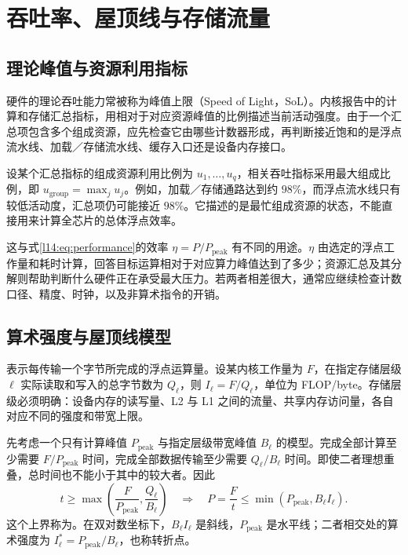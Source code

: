 \section{吞吐率、屋顶线与存储流量}
\label{l14:sec:roofline}

\subsection{理论峰值与资源利用指标}

硬件的理论吞吐能力常被称为峰值上限（Speed of Light，SoL）。内核报告中的计算和存储汇总指标，用相对于对应资源峰值的比例描述当前活动强度。由于一个汇总项包含多个组成资源，应先检查它由哪些计数器形成，再判断接近饱和的是浮点流水线、加载／存储流水线、缓存入口还是设备内存接口。

设某个汇总指标的组成资源利用比例为 $u_1,\ldots,u_q$，相关吞吐指标采用最大组成比例，即 $u_{\mathrm{group}}=\max_j u_j$。例如，加载／存储通路达到约 $98\%$，而浮点流水线只有较低活动度，汇总项仍可能接近 $98\%$。它描述的是最忙组成资源的状态，不能直接用来计算全芯片的总体浮点效率。

这与式\eqref{l14:eq:performance}的效率 $\eta=P/P_{\mathrm{peak}}$ 有不同的用途。$\eta$ 由选定的浮点工作量和耗时计算，回答目标运算相对于对应算力峰值达到了多少；资源汇总及其分解则帮助判断什么硬件正在承受最大压力。若两者相差很大，通常应继续检查计数口径、精度、时钟，以及非算术指令的开销。

\subsection{算术强度与屋顶线模型}

表示每传输一个字节所完成的浮点运算量。设某内核工作量为 $F$，在指定存储层级 $\ell$ 实际读取和写入的总字节数为 $Q_\ell$，则 $I_\ell=F/Q_\ell$，单位为 FLOP/byte。存储层级必须明确：设备内存的读写量、L2 与 L1 之间的流量、共享内存访问量，各自对应不同的强度和带宽上限。

先考虑一个只有计算峰值 $P_{\mathrm{peak}}$ 与指定层级带宽峰值 $B_\ell$ 的模型。完成全部计算至少需要 $F/P_{\mathrm{peak}}$ 时间，完成全部数据传输至少需要 $Q_\ell/B_\ell$ 时间。即使二者理想重叠，总时间也不能小于其中的较大者。因此
\begin{equation}
 t\geq\max\left(\frac{F}{P_{\mathrm{peak}}},
                 \frac{Q_\ell}{B_\ell}\right)
 \quad\Longrightarrow\quad
 P=\frac{F}{t}\leq\min\left(P_{\mathrm{peak}},B_\ell I_\ell\right).
 \label{l14:eq:roofline}
\end{equation}
这个上界称为。在双对数坐标下，$B_\ell I_\ell$ 是斜线，$P_{\mathrm{peak}}$ 是水平线；二者相交处的算术强度为 $I_\ell^*=P_{\mathrm{peak}}/B_\ell$，也称转折点。

